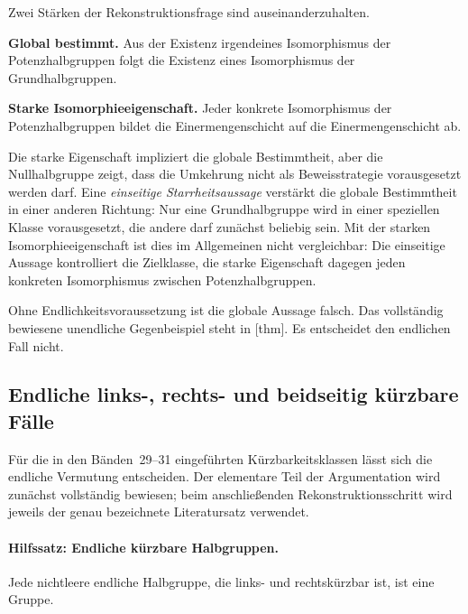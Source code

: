 \documentclass[main.tex]{subfiles}
\begin{document}
Zwei Stärken der Rekonstruktionsfrage sind auseinanderzuhalten.

\smallskip
\noindent\textbf{Global bestimmt.}
Aus der Existenz irgendeines Isomorphismus der Potenzhalbgruppen folgt die
Existenz eines Isomorphismus der Grundhalbgruppen.

\smallskip
\noindent\textbf{Starke Isomorphieeigenschaft.}
Jeder konkrete Isomorphismus der Potenzhalbgruppen bildet die
Einermengenschicht auf die Einermengenschicht ab.

\smallskip
Die starke Eigenschaft impliziert die globale Bestimmtheit, aber die
Nullhalbgruppe zeigt, dass die Umkehrung nicht als Beweisstrategie vorausgesetzt
werden darf.  Eine \emph{einseitige Starrheitsaussage} verstärkt die globale
Bestimmtheit in einer anderen Richtung: Nur eine Grundhalbgruppe wird in
einer speziellen Klasse vorausgesetzt, die andere darf zunächst beliebig
sein.  Mit der starken Isomorphieeigenschaft ist dies im Allgemeinen nicht
vergleichbar: Die einseitige Aussage kontrolliert die Zielklasse, die starke
Eigenschaft dagegen jeden konkreten Isomorphismus zwischen
Potenzhalbgruppen.

Ohne Endlichkeitsvoraussetzung ist die globale Aussage falsch.  Das
vollständig bewiesene unendliche Gegenbeispiel steht in
[thm].  Es entscheidet den
endlichen Fall nicht.

\subsection{Endliche links-, rechts- und beidseitig kürzbare Fälle}

Für die in den Bänden~29--31 eingeführten Kürzbarkeitsklassen lässt sich die
endliche Vermutung entscheiden.  Der elementare Teil der Argumentation wird
zunächst vollständig bewiesen; beim anschließenden Rekonstruktionsschritt
wird jeweils der genau bezeichnete Literatursatz verwendet.

\paragraph{Hilfssatz: Endliche kürzbare Halbgruppen.}
Jede nichtleere endliche Halbgruppe, die links- und rechtskürzbar ist, ist
eine Gruppe.
\end{document}
